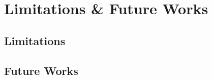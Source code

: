 
\chapter{Limitations \& Future Works} %
\label{chap:limitations}

\begin{comment}
Limitations:
Ip matches, new dga => measure domain to cluster similarity
Clusters that span multiple AS

Future Works:
Better Clustering Algorithm
Conformal Predictor
Save trained SVMs
Deploy
Webapp
Distributed Architecture
C implementation
\end{comment}

\newpage

\section{Limitations} %
\label{sec:limitations}


\section{Future Works} %
\label{sec:future_works}


